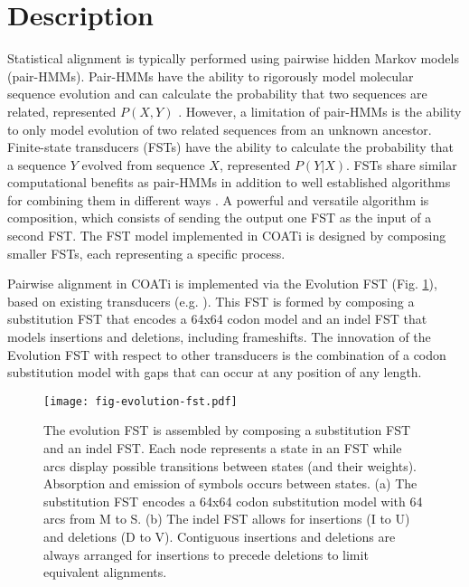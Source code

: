 \section{Description}

Statistical alignment is typically performed using pairwise hidden Markov
models (pair-HMMs).
Pair-HMMs have the ability to rigorously model molecular sequence evolution and
can calculate the probability that two sequences are related, represented
$P(X, Y)$ \parencite{yoon_2009_hmm}.
However, a limitation of pair-HMMs is the ability to only model evolution of two
related sequences from an unknown ancestor.
Finite-state transducers (FSTs) have the ability to calculate the probability
that a sequence $Y$ evolved from sequence $X$, represented $P(Y | X)$.
FSTs share similar computational benefits as pair-HMMs in addition to well
established algorithms for combining them in different ways
\parencite{bradley2007transducers}.
A powerful and versatile algorithm is composition, which consists of sending the
output one FST as the input of a second FST.
The FST model implemented in COATi is designed by composing smaller FSTs, each
representing a specific process.

Pairwise alignment in COATi is implemented via the Evolution FST (Fig.
\ref{fig:evolution-fst}), based on existing transducers (e.g.
\cite{holmes2001evolutionary}).
This FST is formed by composing a substitution FST that encodes a 64x64 codon
model and an indel FST that models insertions and deletions, including frameshifts.
The innovation of the Evolution FST with respect to other transducers is the
combination of a codon substitution model with gaps that can occur at any
position of any length.

\begin{figure}[h!]
\begin{framed}
\centering
    \texttt{[image: fig-evolution-fst.pdf]}
    \caption{The evolution FST is assembled by composing a substitution FST and
    an indel FST. Each node represents a state in an FST while arcs display
    possible transitions between states (and their weights). Absorption and
    emission of symbols occurs between states. (a) The substitution FST
    encodes a 64x64 codon substitution model with 64 arcs from M to S. (b)
    The indel FST allows for insertions (I to U) and deletions (D to V).
    Contiguous insertions and deletions are always arranged for insertions to
    precede deletions to limit equivalent alignments.}
    \label{fig:evolution-fst}
\end{framed}
\end{figure}



